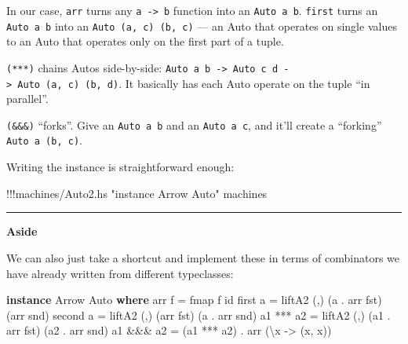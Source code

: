 \documentclass[]{article}
\newenvironment{Shaded}{}{}
\newcommand{\KeywordTok}[1]{\textcolor[rgb]{0.00,0.44,0.13}{\textbf{{#1}}}}
\newcommand{\DataTypeTok}[1]{\textcolor[rgb]{0.56,0.13,0.00}{{#1}}}
\newcommand{\StringTok}[1]{\textcolor[rgb]{0.25,0.44,0.63}{{#1}}}
\newcommand{\OtherTok}[1]{\textcolor[rgb]{0.00,0.44,0.13}{{#1}}}
\newcommand{\FunctionTok}[1]{\textcolor[rgb]{0.02,0.16,0.49}{{#1}}}
\newcommand{\NormalTok}[1]{{#1}}
\begin{document}
In our case, \texttt{arr} turns any \texttt{a\ -\textgreater{}\ b}
function into an \texttt{Auto\ a\ b}. \texttt{first} turns an
\texttt{Auto\ a\ b} into an \texttt{Auto\ (a,\ c)\ (b,\ c)} --- an Auto
that operates on single values to an Auto that operates only on the
first part of a tuple.

\texttt{(***)} chains Autos side-by-side:
\texttt{Auto\ a\ b\ -\textgreater{}\ Auto\ c\ d\ -\textgreater{}\ Auto\ (a,\ c)\ (b,\ d)}.
It basically has each Auto operate on the tuple ``in parallel''.

\texttt{(\&\&\&)} ``forks''. Give an \texttt{Auto\ a\ b} and an
\texttt{Auto\ a\ c}, and it'll create a ``forking''
\texttt{Auto\ a\ (b,\ c)}.

Writing the instance is straightforward enough:

\begin{Shaded}
\begin{Highlighting}[]
\FunctionTok{!!!}\NormalTok{machines}\FunctionTok{/}\NormalTok{Auto2.hs }\StringTok{"instance Arrow Auto"} \NormalTok{machines}
\end{Highlighting}
\end{Shaded}

\begin{center}\rule{0.5\linewidth}{\linethickness}\end{center}

\textbf{Aside}

We can also just take a shortcut and implement these in terms of
combinators we have already written from different typeclasses:

\begin{Shaded}
\begin{Highlighting}[]
\KeywordTok{instance} \DataTypeTok{Arrow} \DataTypeTok{Auto} \KeywordTok{where}
    \NormalTok{arr f     }\FunctionTok{=} \NormalTok{fmap f id}
    \NormalTok{first a   }\FunctionTok{=} \NormalTok{liftA2 (,) (a  }\FunctionTok{.} \NormalTok{arr fst) (arr snd)}
    \NormalTok{second a  }\FunctionTok{=} \NormalTok{liftA2 (,) (arr fst)      (a  }\FunctionTok{.} \NormalTok{arr snd)}
    \NormalTok{a1 }\FunctionTok{***} \NormalTok{a2 }\FunctionTok{=} \NormalTok{liftA2 (,) (a1 }\FunctionTok{.} \NormalTok{arr fst) (a2 }\FunctionTok{.} \NormalTok{arr snd)}
    \NormalTok{a1 }\FunctionTok{&&&} \NormalTok{a2 }\FunctionTok{=} \NormalTok{(a1 }\FunctionTok{***} \NormalTok{a2) }\FunctionTok{.} \NormalTok{arr (\textbackslash{}x }\OtherTok{->} \NormalTok{(x, x))}
\end{Highlighting}
\end{Shaded}
\end{document}

